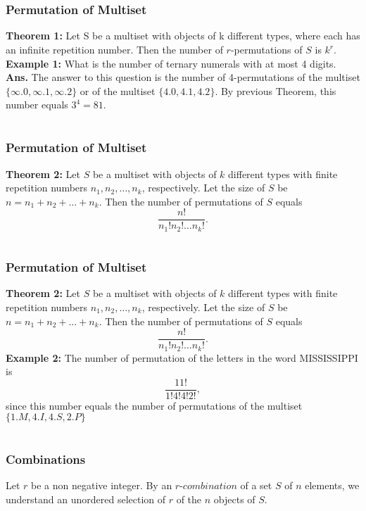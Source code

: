 \documentclass{beamer}
\begin{document}
\section{}
 \begin{frame}
\frametitle{Permutation of Multiset}
{\bf Theorem 1:} Let S be a multiset with objects of k different types, where each has an infinite repetition number. Then the number of $r$-permutations of $S$ is $k^r$.\\{\vspace{1cm}}
{\bf Example 1:} What is the number of ternary numerals with at most 4 digits.\\
{\bf Ans. } The answer to this question is the number of 4-permutations of the multiset  $\{ \infty.0, \infty.1, \infty.2 \}$   or of the multiset $ \{ 4.0, 4.1, 4.2 \} $. By previous Theorem, this number equals $3^4=81$.
\end{frame}

\section{}
 \begin{frame}
\frametitle{Permutation of Multiset}
{\bf Theorem 2: }Let $S$ be a multiset with objects of $k$ different types with finite repetition numbers $n_1,n_2,\dots,n_k$, respectively. Let the size of $S$ be $n=n_1+n_2+\dots+n_k$. Then the number of permutations of $S$ equals 
     $$ \frac{n!}{n_1!n_2!\dots n_k!}.$$
     \end{frame}

\section{}
 \begin{frame}
\frametitle{Permutation of Multiset}
{\bf Theorem 2: }Let $S$ be a multiset with objects of $k$ different types with finite repetition numbers $n_1,n_2,\dots,n_k$, respectively. Let the size of $S$ be $n=n_1+n_2+\dots+n_k$. Then the number of permutations of $S$ equals 
     $$ \frac{n!}{n_1!n_2!\dots n_k!}.$$
{\bf Example 2: } The number of  permutation of the letters in the word MISSISSIPPI is
 $$\frac{11!}{1!4!4!2!},$$
 since this number equals the number of permutations of the multiset $\{ 1.M, 4.I, 4.S, 2.P \}$
\end{frame}

\section{}
 \begin{frame}
\frametitle{Combinations}
Let $r$ be a non negative integer. By an $r$-$combination$ of a set $S$ of $n$ elements, we understand an unordered selection of $r$ of the $n$ objects of $S$.
\end{frame}
\end{document}

